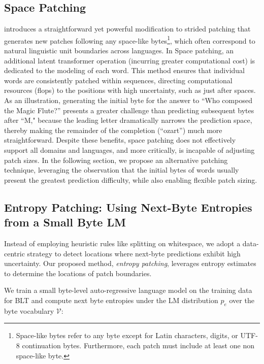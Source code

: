 \subsection{Space Patching}
\label{section:white-patch}

\citet{slagle2024spacebyte} introduces a straightforward yet powerful modification to strided patching that generates new patches following any space-like bytes\footnote{
    Space-like bytes refer to any byte except for Latin characters, digits, or UTF-8 continuation bytes. Furthermore, each patch must include at least one non space-like byte.}, which often correspond to natural linguistic unit boundaries across languages. In Space patching, an additional latent transformer operation (incurring greater computational cost) is dedicated to the modeling of each word. This method ensures that individual words are consistently patched within sequences, directing computational resources (flops) to the positions with high uncertainty, such as just after spaces. As an illustration, generating the initial byte for the answer to “Who composed the Magic Flute?\uline{\hspace{.6em}}” presents a greater challenge than predicting subsequent bytes after ``M," because the leading letter dramatically narrows the prediction space, thereby making the remainder of the completion (``ozart'') much more straightforward. Despite these benefits, space patching does not effectively support all domains and languages, and more critically, is incapable of adjusting patch sizes. In the following section, we propose an alternative patching technique, leveraging the observation that the initial bytes of words usually present the greatest prediction difficulty, while also enabling flexible patch sizing.

\subsection{Entropy Patching: Using Next-Byte Entropies from a Small Byte LM}
\label{section:dyn-patch}

Instead of employing heuristic rules like splitting on whitespace, we adopt a data-centric strategy to detect locations where next-byte predictions exhibit high uncertainty. Our proposed method, \textit{entropy patching}, leverages entropy estimates to determine the locations of patch boundaries.

We train a small byte-level auto-regressive language model on the training data for {\textsc BLT} and compute next byte entropies under the LM distribution $p_{e}$ over the byte vocabulary $\mathcal{V}$:

